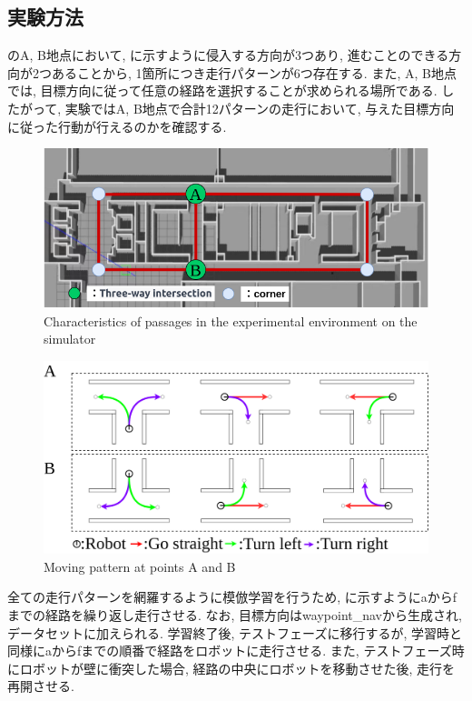 \subsection{実験方法}
のA, B地点において, に示すように侵入する方向が3つあり, 進むことのできる方向が2つあることから, 1箇所につき走行パターンが6つ存在する. 
また, A, B地点では, 目標方向に従って任意の経路を選択することが求められる場所である.
したがって, 実験ではA, B地点で合計12パターンの走行において, 与えた目標方向に従った行動が行えるのかを確認する.

\begin{figure}[hbtp]
  \centering
 \includegraphics[keepaspectratio, scale=0.5]
      {images/sim_explain.png}
 \caption{Characteristics of passages in the experimental environment on the simulator}
 \label{Fig:sim_explain}
\end{figure}

\begin{figure}[hbtp]
  \centering
 \includegraphics[keepaspectratio, scale=0.15]
      {images/select.png}
 \caption{Moving pattern at points A and B}
 \label{Fig:select}
\end{figure}

全ての走行パターンを網羅するように模倣学習を行うため, に示すようにaからfまでの経路を繰り返し走行させる. なお, 目標方向はwaypoint\_navから生成され, データセットに加えられる. 学習終了後, テストフェーズに移行するが, 学習時と同様にaからfまでの順番で経路をロボットに走行させる. また, テストフェーズ時にロボットが壁に衝突した場合, 経路の中央にロボットを移動させた後, 走行を再開させる.

